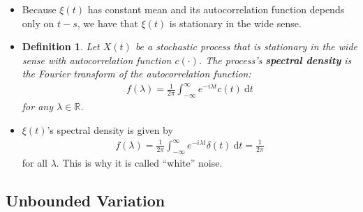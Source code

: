 \documentclass[10pt]{article}
\newtheorem{definition}[lemma]{Definition}
\newcommand{\dee}{\mathrm{d}}
\newcommand{\Real}{\mathbb{R}}
\begin{document}
\begin{itemize}
  \item Because $\xi(t)$ has constant mean and its autocorrelation function depends only on $t-s$, we have that $\xi(t)$ is stationary in the wide sense.

  \item \begin{definition}
    Let $X(t)$ be a stochastic process that is stationary in the wide sense with autocorrelation function $c(\cdot)$. The process's {\bf spectral density} is the Fourier transform of the autocorrelation function:
    \begin{align*}
      f(\lambda) = \frac{1}{2\pi} \int_{-\infty}^\infty e^{-i\lambda t} c(t)\ \dee t
    \end{align*}
    for any $\lambda \in \Real$.
  \end{definition}  

  \item $\xi(t)$'s spectral density is given by
  \begin{align*}
    f(\lambda) = \frac{1}{2\pi} \int_{-\infty}^\infty e^{-i\lambda t} \delta(t) \ \dee t = \frac{1}{2\pi}
  \end{align*}
  for all $\lambda$. This is why it is called ``white'' noise.  
\end{itemize}

\subsection{Unbounded Variation}
\end{document}
